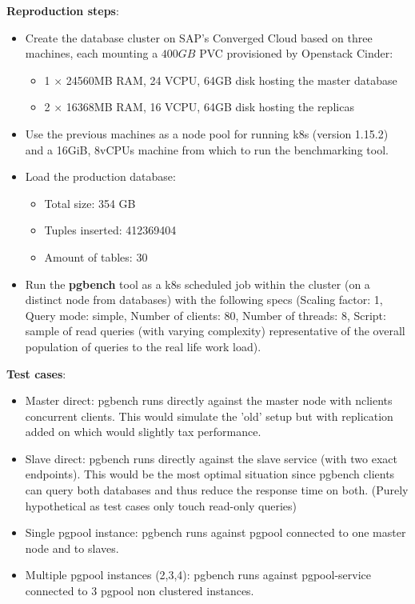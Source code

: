 \documentclass[11pt]{article}
\begin{document}
\textbf{Reproduction steps}:
\begin{itemize}
    \item Create the database cluster on SAP's Converged Cloud based on three machines, each mounting a $400GB$ PVC provisioned by Openstack Cinder:
    \begin{itemize}
        \item 1 $\times$ 24560MB RAM, 24 VCPU, 64GB disk hosting the master database
        \item 2 $\times$ 16368MB RAM, 16 VCPU, 64GB disk hosting the replicas
    \end{itemize}
    \item Use the previous machines as a node pool for running k8s (version 1.15.2) and a 16GiB, 8vCPUs machine from which to run the benchmarking tool.
    \item Load the production database:
    \begin{itemize}
        \item Total size: 354 GB
        \item Tuples inserted: 412369404
        \item Amount of tables: 30
    \end{itemize}
    \item Run the \textbf{pgbench} tool as a k8s scheduled job within the cluster (on a distinct node from databases) with the following specs (Scaling factor: 1, Query mode: simple, Number of clients: 80, Number of threads: 8, Script: sample of read queries (with varying complexity) representative of the overall population of queries to the real life work load).
\end{itemize}

\textbf{Test cases}:
\begin{itemize}
    \item Master direct: pgbench runs directly against the master node with nclients concurrent clients. This would simulate the 'old' setup but with replication added on which would slightly tax performance.
    \item Slave direct: pgbench runs directly against the slave service (with two exact endpoints). This would be the most optimal situation since pgbench clients can query both databases and thus reduce the response time on both. (Purely hypothetical as test cases only touch read-only queries)
    \item Single pgpool instance: pgbench runs against pgpool connected to one master node and to slaves.
    \item Multiple pgpool instances (2,3,4): pgbench runs against pgpool-service connected to 3 pgpool non clustered instances.
\end{itemize}
\end{document}

